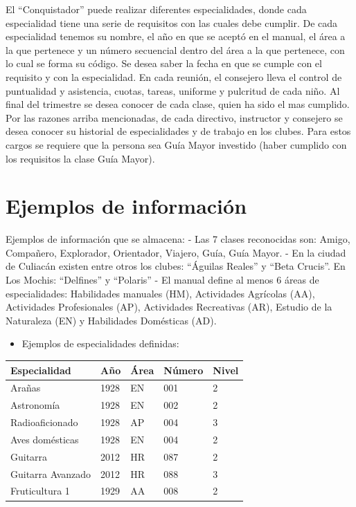 \documentclass[
  letterpaper,
  DIV=11,
  numbers=noendperiod]{scrreprt}
\providecommand{\tightlist}{%
  \setlength{\itemsep}{0pt}\setlength{\parskip}{0pt}}\usepackage{longtable,booktabs,array}
\begin{document}
El ``Conquistador'' puede realizar diferentes especialidades, donde cada
especialidad tiene una serie de requisitos con las cuales debe cumplir.
De cada especialidad tenemos su nombre, el año en que se aceptó en el
manual, el área a la que pertenece y un número secuencial dentro del
área a la que pertenece, con lo cual se forma su código. Se desea saber
la fecha en que se cumple con el requisito y con la especialidad. En
cada reunión, el consejero lleva el control de puntualidad y asistencia,
cuotas, tareas, uniforme y pulcritud de cada niño. Al final del
trimestre se desea conocer de cada clase, quien ha sido el mas cumplido.
Por las razones arriba mencionadas, de cada directivo, instructor y
consejero se desea conocer su historial de especialidades y de trabajo
en los clubes. Para estos cargos se requiere que la persona sea Guía
Mayor investido (haber cumplido con los requisitos la clase Guía Mayor).

\section{Ejemplos de información}\label{ejemplos-de-informaciuxf3n}

Ejemplos de información que se almacena: - Las 7 clases reconocidas son:
Amigo, Compañero, Explorador, Orientador, Viajero, Guía, Guía Mayor. -
En la ciudad de Culiacán existen entre otros los clubes: ``Águilas
Reales'' y ``Beta Crucis''. En Los Mochis: ``Delfines'' y ``Polaris'' -
El manual define al menos 6 áreas de especialidades: Habilidades
manuales (HM), Actividades Agrícolas (AA), Actividades Profesionales
(AP), Actividades Recreativas (AR), Estudio de la Naturaleza (EN) y
Habilidades Domésticas (AD).

\begin{itemize}
\tightlist
\item
  Ejemplos de especialidades definidas:
\end{itemize}

\begin{longtable}[]{@{}lllll@{}}
\toprule\noalign{}
Especialidad & Año & Área & Número & Nivel \\
\midrule\noalign{}
\endhead
\bottomrule\noalign{}
\endlastfoot
Arañas & 1928 & EN & 001 & 2 \\
Astronomía & 1928 & EN & 002 & 2 \\
Radioaficionado & 1928 & AP & 004 & 3 \\
Aves domésticas & 1928 & EN & 004 & 2 \\
Guitarra & 2012 & HR & 087 & 2 \\
Guitarra Avanzado & 2012 & HR & 088 & 3 \\
Fruticultura 1 & 1929 & AA & 008 & 2 \\
\end{longtable}
\end{document}
